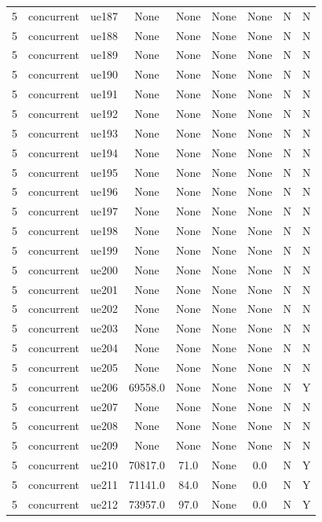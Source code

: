 \begin{table}[ht]
\begin{tabular}{|c|c|c|c|c|c|c|c|c|}
5 & concurrent & ue187 & None & None & None & None & N & N \\
5 & concurrent & ue188 & None & None & None & None & N & N \\
5 & concurrent & ue189 & None & None & None & None & N & N \\
5 & concurrent & ue190 & None & None & None & None & N & N \\
5 & concurrent & ue191 & None & None & None & None & N & N \\
5 & concurrent & ue192 & None & None & None & None & N & N \\
5 & concurrent & ue193 & None & None & None & None & N & N \\
5 & concurrent & ue194 & None & None & None & None & N & N \\
5 & concurrent & ue195 & None & None & None & None & N & N \\
5 & concurrent & ue196 & None & None & None & None & N & N \\
5 & concurrent & ue197 & None & None & None & None & N & N \\
5 & concurrent & ue198 & None & None & None & None & N & N \\
5 & concurrent & ue199 & None & None & None & None & N & N \\
5 & concurrent & ue200 & None & None & None & None & N & N \\
5 & concurrent & ue201 & None & None & None & None & N & N \\
5 & concurrent & ue202 & None & None & None & None & N & N \\
5 & concurrent & ue203 & None & None & None & None & N & N \\
5 & concurrent & ue204 & None & None & None & None & N & N \\
5 & concurrent & ue205 & None & None & None & None & N & N \\
5 & concurrent & ue206 & 69558.0 & None & None & None & N & Y \\
5 & concurrent & ue207 & None & None & None & None & N & N \\
5 & concurrent & ue208 & None & None & None & None & N & N \\
5 & concurrent & ue209 & None & None & None & None & N & N \\
5 & concurrent & ue210 & 70817.0 & 71.0 & None & 0.0 & N & Y \\
5 & concurrent & ue211 & 71141.0 & 84.0 & None & 0.0 & N & Y \\
5 & concurrent & ue212 & 73957.0 & 97.0 & None & 0.0 & N & Y \\

\end{tabular}
\end{table}
